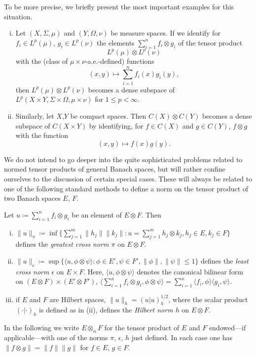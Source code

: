 To be more precise, we briefly present the most important examples for this situation.
\begin{examples}\label{ex:a1-5.1}
\begin{enumerate}[(i), wide, labelsep=1em, itemindent=\parindent]

\item
Let $(X,\Sigma,\mu)$ and $(Y,\Omega,\nu)$ be measure spaces. 
If we identify for $f_{i} \in L^{p}(\mu)$, $g_{i} \in L^{p}(\nu)$ the elements $\sum_{i=1}^{n} f_{i} \otimes g_{i}$ of the tensor product
\[
    L^{p}(\mu) \otimes L^{p}(\nu)
\]
with the (class of $\mu \times \nu$-a.e.-defined) functions
\[
    (x,y) \mapsto \sum_{i=1}^{n} f_{i}(x)g_{i}(y) ,
\]
then $L^{p}(\mu) \otimes L^{p}(\nu)$ becomes a dense subspace of $L^{p}(X\times Y,\Sigma\times\Omega,\mu\times\nu)$ for $1 \leq p < \infty$.

\item
Similarly, let $X$,$Y$ be compact spaces. Then $C(X) \otimes C(Y)$ becomes a dense subspace of $C(X\times Y)$ by identifying, for $f \in C(X)$ and $g \in C(Y)$, $f \otimes g$ with the function
\[
    (x,y) \mapsto f(x)g(y) .
\]
\end{enumerate}
\end{examples}
We do not intend to go deeper into the quite sophisticated problems related to normed tensor products of general Banach spaces, but will rather confine ourselves to the discussion of certain special cases.
These will always be related to one of the following standard methods to define a norm on the tensor product of two Banach spaces $E$, $F$.

Let $u \coloneqq \sum_{i=1}^{n} f_{i} \otimes g_{i}$ be an element of $E \otimes F$. 
Then
\begin{enumerate}[(i), wide, labelsep=1em, itemindent=\parindent]

\item
$\|u\|_{\pi} \coloneqq \inf\{\sum_{j=1}^{m} \|h_{j}\|\|k_{j}\| \colon u = \sum_{j=1}^{m}h_{j} \otimes k_{j}, h_{j} \in E, k_{j} \in F\}$ defines the \emph{greatest cross norm $\pi$} on $E \otimes F$.

\item
$\|u\|_{\epsilon} \coloneqq \sup\{\langle u,\phi \otimes \psi\rangle \colon \phi \in E', \psi \in F', \|\phi\|, \|\psi\| \leq 1\}$ defines the 
\emph{least cross norm $\epsilon$} on $E \times F$. 
Here, $\langle u,\phi \otimes \psi\rangle$ denotes the canonical bilinear form on $(E \otimes F) \times (E' \otimes F')$, \ie $\langle\sum_{i=1}^{n} f_{i} \otimes g_{i},\phi \otimes \psi\rangle = \sum_{i=1}^{n} \langle f_{i},\phi\rangle\langle g_{i},\psi\rangle$.

\item
if $E$ and $F$ are Hilbert spaces, $\|u\|_{h} = (u|u)_{h}^{1/2}$, where the scalar product $(\cdot|\cdot)_{h}$ is defined as in (ii), defines the \emph{Hilbert norm $h$} on $E \otimes F$.
\end{enumerate}
In the following we write $E \otimes_{\alpha} F$ for the tensor product of $E$ and $F$ endowed---if applicable---with one of the norms $\pi$, $\epsilon$, $h$ just defined.
In each case one has $\|f \otimes g\| = \|f\|\|g\|$ for $f \in E$, $g \in F$.

